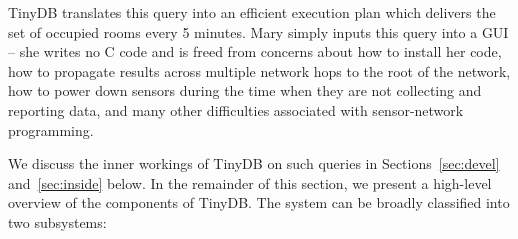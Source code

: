 \documentclass[11pt]{article}
\begin{document}

\noindent TinyDB translates this query into an efficient
execution plan which
delivers the set of occupied rooms every 5 minutes.  Mary simply inputs this query
into a GUI -- she writes no C code and is freed from 
concerns about how to install her code, how to propagate results across
multiple network hops to the root of the network, how to power down sensors 
during the time when they are not collecting and reporting data, and many other
difficulties associated with sensor-network programming.

We discuss the inner workings of TinyDB on such queries in
Sections~\ref{sec:devel} and~\ref{sec:inside} below.  In the remainder of this section, we
present a high-level overview of the components of TinyDB.  The system
can be broadly classified into two subsystems:
\end{document}
